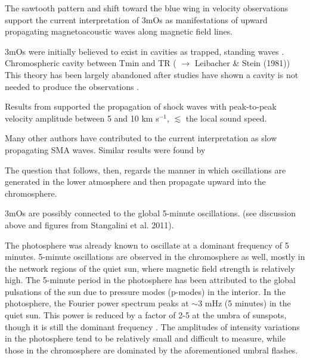 The sawtooth pattern and shift toward the blue wing in velocity observations
support the current
interpretation of 3mOs as manifestations of upward propagating
magnetoacoustic waves along magnetic field lines.

3mOs were initially believed to exist in cavities as
trapped, standing waves \citep{Scheuer1981}.
Chromospheric cavity between Tmin and TR
(\cite{Chae2015} $\rightarrow$ Leibacher \& Stein (1981))
This theory has been largely abandoned after studies have shown a cavity
is not needed to produce the observations
\citep{Fleck1991}.


Results from \cite{Tian2014} supported the propagation of shock waves
with peak-to-peak velocity amplitude between 5 and 10 km s$^{-1}$,
$\lesssim$ the local sound speed.

Many other authors have contributed to the
current interpretation as slow propagating SMA waves.
Similar results were found by
\cite{Brynildsen2004, Maltby1999, DeMoortel2000, OShea2002,
Brynildsen1999b, Brynildsen2002, Reznikova2012}



The question that follows, then, regards the manner in which oscillations
are generated in the lower atmosphere and then
propagate upward into the chromosphere.

3mOs are possibly connected to the global 5-minute oscillations.
(see discussion above and figures from Stangalini et al. 2011).

The photosphere was already known to oscillate at a dominant frequency of 5
minutes. 5-minute oscillations are observed in the chromosphere as well, mostly
in the network regions of the quiet sun, where magnetic field strength is
relatively high. The 5-minute period in the photosphere has been attributed to
the global pulsations of the sun due to pressure modes (p-modes) in the
interior. In the photosphere, the Fourier power spectrum peaks at $\sim$3 mHz
(5 minutes) in the quiet sun. This power is reduced by a factor of 2-5 at the
umbra of sunspots, though it is still the dominant frequency \citep{Felipe2010;
Bogdan2006 p. 323}. The amplitudes of intensity variations in the photosphere
tend to be relatively small and difficult to measure, while those in the
chromosphere are dominated by the aforementioned umbral flashes.

